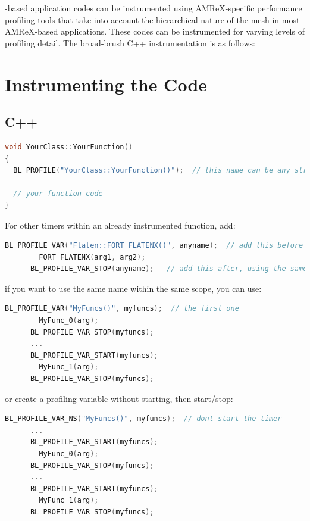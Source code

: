 \amrex-based application codes can be instrumented using AMReX-specific performance
profiling tools that take into account the hierarchical nature of the mesh in 
most AMReX-based applications.  These codes can be instrumented for varying levels of 
profiling detail.  The broad-brush C++ instrumentation is as follows:

\section{Instrumenting the Code} 
\subsection{C++} 

\begin{lstlisting}[language=cpp]
void YourClass::YourFunction() 
{
  BL_PROFILE("YourClass::YourFunction()");  // this name can be any string

  // your function code
}
\end{lstlisting}

For other timers within an already instrumented function, add:
 
\begin{lstlisting}[language=cpp]
      BL_PROFILE_VAR("Flaten::FORT_FLATENX()", anyname);  // add this before
        FORT_FLATENX(arg1, arg2);
      BL_PROFILE_VAR_STOP(anyname);   // add this after, using the same name
\end{lstlisting}
 
if you want to use the same name within the same scope, you can use:
 
\begin{lstlisting}[language=cpp]
      BL_PROFILE_VAR("MyFuncs()", myfuncs);  // the first one
        MyFunc_0(arg);
      BL_PROFILE_VAR_STOP(myfuncs);
      ...
      BL_PROFILE_VAR_START(myfuncs);
        MyFunc_1(arg);
      BL_PROFILE_VAR_STOP(myfuncs);
\end{lstlisting}
 
or create a profiling variable without starting, then start/stop:
 
\begin{lstlisting}[language=cpp]
      BL_PROFILE_VAR_NS("MyFuncs()", myfuncs);  // dont start the timer
      ...
      BL_PROFILE_VAR_START(myfuncs);
        MyFunc_0(arg);
      BL_PROFILE_VAR_STOP(myfuncs);
      ...
      BL_PROFILE_VAR_START(myfuncs);
        MyFunc_1(arg);
      BL_PROFILE_VAR_STOP(myfuncs);
\end{lstlisting}

